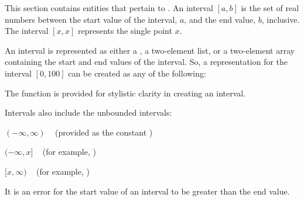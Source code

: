 \documentclass[10pt,twoside,english,pdftex]{article}
\begin{document}
This section contains  entities that pertain to
. An interval $[a,b]$ is the set of real numbers between the
start value of the interval, $a$, and the end value, $b$, inclusive. The
interval $[x,x]$ represents the single point $x$.

An interval is represented as either a , a two-element list, or a
two-element array containing the start and end values of the interval.  So, a
representation for the interval $[0,100]$ can be created as any of the
following:
\begin{tightitemize}
\item {}
\item {}
\item {}
\end{tightitemize}
%
The function \textbf{} is provided for stylistic
clarity in creating an interval.

%
%
Intervals also include the unbounded intervals:
\begin{tightitemize}
\item $(-\infty,\infty)$ ~ (provided as the constant 
  \textbf{})
\item $(-\infty,x]$      ~ (for example, 
   )
\item $[x,\infty)$       ~ (for example, 
   )
\end{tightitemize}

It is an error for the start value of an interval to be greater than the end
value.

\W\entities
\T\clearpage

\end{document}
